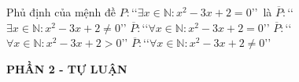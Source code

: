 \begin{ex}%
	Phủ định của mệnh đề $P \colon $\lq\lq $\exists x \in \mathbb{N} \colon x^2-3x+2=0$\rq\rq \ là
	\choice
	{$\overline{P} \colon$\lq\lq $\exists x \in \mathbb{N} \colon x^2-3x+2 \ne 0$\rq\rq}
	{$\overline{P} \colon$\lq\lq $\forall x \in \mathbb{N} \colon x^2-3x+2 = 0$\rq\rq}
	{$\overline{P} \colon$\lq\lq $\forall x \in \mathbb{N} \colon x^2-3x+2 > 0$\rq\rq}
	{\True $\overline{P} \colon$\lq\lq $\forall x \in \mathbb{N} \colon x^2-3x+2 \ne 0$\rq\rq}
\end{ex}

\begin{center}
	\textbf{PHẦN 2 - TỰ LUẬN}
\end{center}

